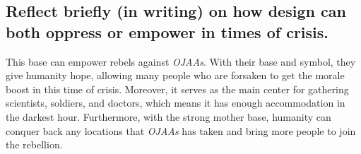 \documentclass[11pt]{book}
\begin{document}
				
			\subsection{Reflect briefly (in writing) on how design can both oppress or empower in times of crisis.}
				This base can empower rebels against \textit{OJAAs}. With their base and symbol, they give humanity hope, allowing many people who are forsaken to get the morale boost in this time of crisis. Moreover, it serves as the main center for gathering scientists, soldiers, and doctors, which means it has enough accommodation in the darkest hour. Furthermore, with the strong mother base, humanity can conquer back any locations that \textit{OJAAs} has taken and bring more people to join the rebellion. 

		
\end{document}
